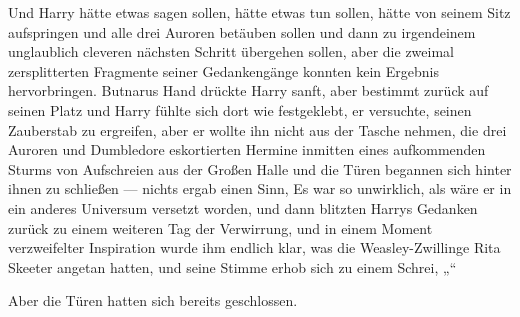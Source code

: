 Und Harry hätte etwas sagen sollen, hätte etwas tun sollen, hätte von seinem Sitz aufspringen und alle drei Auroren betäuben sollen und dann zu irgendeinem unglaublich cleveren nächsten Schritt übergehen sollen, aber die zweimal zersplitterten Fragmente seiner Gedankengänge konnten kein Ergebnis hervorbringen. Butnarus Hand drückte Harry sanft, aber bestimmt zurück auf seinen Platz und Harry fühlte sich dort wie festgeklebt, er versuchte, seinen Zauberstab zu ergreifen, aber er wollte ihn nicht aus der Tasche nehmen, die drei Auroren und Dumbledore eskortierten Hermine inmitten eines aufkommenden Sturms von Aufschreien aus der Großen Halle und die Türen begannen sich hinter ihnen zu schließen — nichts ergab einen Sinn, Es war so unwirklich, als wäre er in ein anderes Universum versetzt worden, und dann blitzten Harrys Gedanken zurück zu einem weiteren Tag der Verwirrung, und in einem Moment verzweifelter Inspiration wurde ihm endlich klar, was die Weasley-Zwillinge Rita Skeeter angetan hatten, und seine Stimme erhob sich zu einem Schrei,
„“

Aber die Türen hatten sich bereits geschlossen.

\later

